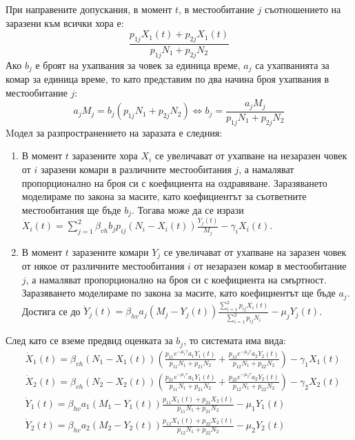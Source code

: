 При направените допускания, в момент $t$, в местообитание $j$ съотношението на заразени към всички хора е:
\begin{equation}
  \frac{p_{1j} X_1(t) + p_{2j} X_1(t)}{p_{1j} N_1 + p_{2j} N_2}
\end{equation}
Ако $b_j$ е броят на ухапвания за човек за единица време, $a_j$ са ухапванията за комар за единица време, то като представим по два начина броя ухапвания в местообитание $j$:
\begin{equation}
  a_j M_j = b_j (p_{1j} N_1 + p_{2j} N_2) \iff b_j = \frac{a_j M_j}{p_{1j} N_1 + p_{2j} N_2}
\end{equation}
Mодел за разпространението на заразата е следния:
\begin{enumerate}
  \item В момент $t$ заразените хора $X_i$ се увеличават от ухапване на незаразен човек от $i$ заразени комари в различните местообитания $j$, а намаляват пропорционално на броя си с коефициента на оздравяване. Заразяването моделираме по закона за масите, като коефициентът за съответните местообитания ще бъде $b_j$. Тогава може да се изрази $\dot{X}_i(t) = \sum_{j=1}^{2} \beta_{vh} b_j p_{ij} (N_i - X_i(t)) \frac{Y_j(t)}{M_j} - \gamma_i X_i(t)$.
  \item В момент $t$ заразените комари $Y_j$ се увеличават от ухапване на заразен човек от някое от различните местообитания $i$ от незаразен комар в местообитание $j$, а намаляват пропорционално на броя си с коефициента на смъртност. Заразяването моделираме по закона за масите, като коефициентът ще бъде $a_j$. Достига се до $\dot{Y}_j(t) = \beta_{hv} a_j (M_j - Y_j(t)) \frac{\sum_{i=1}^2 p_{ij} X_i(t)}{\sum_{i=1}^2 p_{ij} N_i} - \mu_j Y_j(t)$.
\end{enumerate}
След като се вземе предвид оценката за $b_j$, то системата има вида:
\begin{equation}
  \label{eq:MigrationProblem}
  \begin{split}
    &\dot{X}_1(t) = \beta_{vh} (N_1-X_1(t)) \left(\frac{p_{11} e^{-\mu_1 \tau} a_1  Y_1(t)}{p_{11} N_1 + p_{21} N_2} + \frac{p_{12} e^{-\mu_2 \tau} a_2  Y_2(t)}{p_{12} N_1 + p_{22} N_2}\right) - \gamma_1 X_1(t) \\
    &\dot{X}_2(t) = \beta_{vh} (N_2-X_2(t)) \left(\frac{p_{21} e^{-\mu_1 \tau} a_1  Y_1(t)}{p_{11} N_1 + p_{21} N_2} + \frac{p_{22} e^{-\mu_2 \tau} a_2  Y_2(t)}{p_{12} N_1 + p_{22} N_2}\right) - \gamma_2 X_2(t) \\
    &\dot{Y}_1(t) = \beta_{hv} a_1 (M_1-Y_1(t)) \frac{p_{11}  X_1(t) + p_{21}  X_2(t)}{p_{11} N_1 + p_{21} N_2} - \mu_1 Y_1(t) \\
    &\dot{Y}_2(t) = \beta_{hv} a_2 (M_2-Y_2(t)) \frac{p_{12}  X_1(t) + p_{22}  X_2(t)}{p_{12} N_1 + p_{22} N_2} - \mu_2 Y_2(t) \\
  \end{split}
\end{equation}

